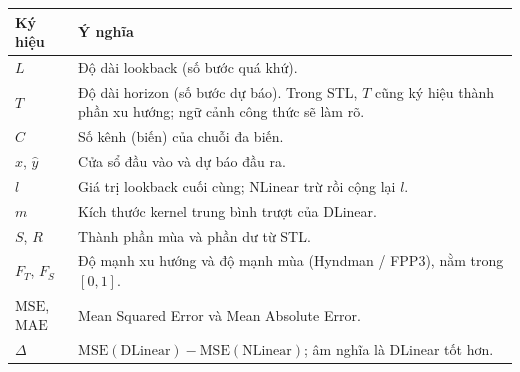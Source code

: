 \begin{center}
  \small
  \begin{tabular}{@{}>{\raggedright\arraybackslash}p{}
    >{\raggedright\arraybackslash}p{}@{}}
    \toprule
    \textbf{Ký hiệu} & \textbf{Ý nghĩa}                                                                    \\
    \midrule
    \(L\)
                     & Độ dài lookback (số bước quá khứ).                                                  \\
    \addlinespace
    \(T\)
                     & Độ dài horizon (số bước dự báo). Trong STL, \(T\) cũng ký hiệu thành phần xu hướng;
    ngữ cảnh công thức sẽ làm rõ.                                                                          \\
    \addlinespace
    \(C\)
                     & Số kênh (biến) của chuỗi đa biến.                                                   \\
    \addlinespace
    \(x\), \(\hat{y}\)
                     & Cửa sổ đầu vào và dự báo đầu ra.                                                    \\
    \addlinespace
    \(l\)
                     & Giá trị lookback cuối cùng; NLinear trừ rồi cộng lại \(l\).                         \\
    \addlinespace
    \(m\)
                     & Kích thước kernel trung bình trượt của DLinear.                                     \\
    \addlinespace
    \(S\), \(R\)
                     & Thành phần mùa và phần dư từ STL.                                                   \\
    \addlinespace
    \(F_T\), \(F_S\)
                     & Độ mạnh xu hướng và độ mạnh mùa (Hyndman / FPP3), nằm trong \([0,1]\).              \\
    \addlinespace
    \(\mathrm{MSE}\), \(\mathrm{MAE}\)
                     & Mean Squared Error và Mean Absolute Error.                                          \\
    \addlinespace
    \(\Delta\)
                     & \(\mathrm{MSE}(\mathrm{DLinear}) - \mathrm{MSE}(\mathrm{NLinear})\);
    âm nghĩa là DLinear tốt hơn.                                                                           \\
    \bottomrule
  \end{tabular}
\end{center}
